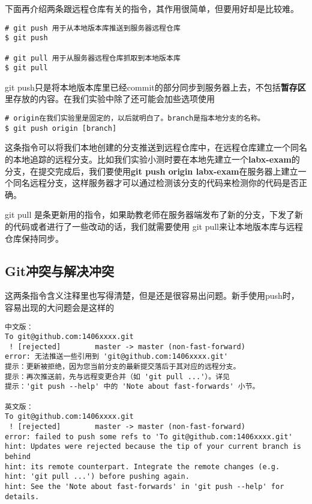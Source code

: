 下面再介绍两条跟远程仓库有关的指令，其作用很简单，但要用好却是比较难。
\begin{verbatim}
# git push 用于从本地版本库推送到服务器远程仓库
$ git push

# git pull 用于从服务器远程仓库抓取到本地版本库
$ git pull
\end{verbatim}
git push只是将本地版本库里已经commit的部分同步到服务器上去，不包括\textbf{暂存区}里存放的内容。在我们实验中除了还可能会加些选项使用

\begin{verbatim}
# origin在我们实验里是固定的，以后就明白了。branch是指本地分支的名称。
$ git push origin [branch]
\end{verbatim}

这条指令可以将我们本地创建的分支推送到远程仓库中，在远程仓库建立一个同名的本地追踪的远程分支。比如我们实验小测时要在本地先建立一个\textbf{labx-exam}的分支，在提交完成后，我们要使用\textbf{git push origin labx-exam}在服务器上建立一个同名远程分支，这样服务器才可以通过检测该分支的代码来检测你的代码是否正确。

git pull\label{更新指令} 是条更新用的指令，如果助教老师在服务器端发布了新的分支，下发了新的代码或者进行了一些改动的话，我们就需要使用 git pull来让本地版本库与远程仓库保持同步。

\subsection{Git冲突与解决冲突}

这两条指令含义注释里也写得清楚，但是还是很容易出问题。新手使用push时，容易出现的大问题会是这样的

\begin{verbatim}
中文版：
To git@github.com:1406xxxx.git
 ! [rejected]        master -> master (non-fast-forward) 
error: 无法推送一些引用到 'git@github.com:1406xxxx.git' 
提示：更新被拒绝，因为您当前分支的最新提交落后于其对应的远程分支。 
提示：再次推送前，先与远程变更合并（如 'git pull ...'）。详见 
提示：'git push --help' 中的 'Note about fast-forwards' 小节。

英文版：
To git@github.com:1406xxxx.git
 ! [rejected]        master -> master (non-fast-forward)
error: failed to push some refs to 'To git@github.com:1406xxxx.git'
hint: Updates were rejected because the tip of your current branch is behind
hint: its remote counterpart. Integrate the remote changes (e.g.
hint: 'git pull ...') before pushing again.
hint: See the 'Note about fast-forwards' in 'git push --help' for details.
\end{verbatim}

